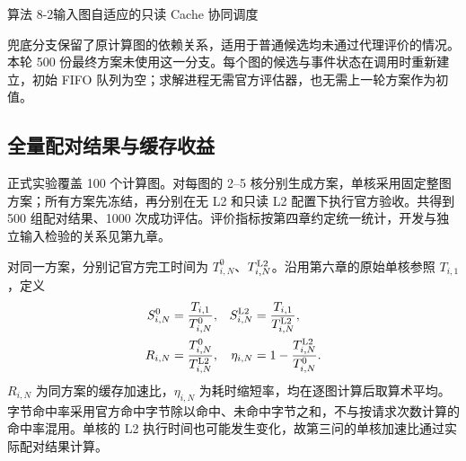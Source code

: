 \begin{algorithmblock}{算法 8-2\quad 输入图自适应的只读 Cache 协同调度}
\end{algorithmblock}

兜底分支保留了原计算图的依赖关系，适用于普通候选均未通过代理评价的情况。本轮 500 份最终方案未使用这一分支。每个图的候选与事件状态在调用时重新建立，初始 FIFO 队列为空；求解进程无需官方评估器，也无需上一轮方案作为初值。

\subsection{全量配对结果与缓存收益}
正式实验覆盖 100 个计算图。对每图的 2--5 核分别生成方案，单核采用固定整图方案；所有方案先冻结，再分别在无 L2 和只读 L2 配置下执行官方验收。共得到 500 组配对结果、1000 次成功评估。评价指标按第四章约定统一统计，开发与独立输入检验的关系见第九章。

对同一方案，分别记官方完工时间为 $T^0_{i,N}$、$T^{\rm L2}_{i,N}$。沿用第六章的原始单核参照 $T_{i,1}$，定义
\begin{equation}
\begin{aligned}
S^0_{i,N}&=\frac{T_{i,1}}{T^0_{i,N}},&
S^{\rm L2}_{i,N}&=\frac{T_{i,1}}{T^{\rm L2}_{i,N}},\\
R_{i,N}&=\frac{T^0_{i,N}}{T^{\rm L2}_{i,N}},&
\eta_{i,N}&=1-\frac{T^{\rm L2}_{i,N}}{T^0_{i,N}}.
\end{aligned}
\label{eq:q3-metrics}
\end{equation}
$R_{i,N}$ 为同方案的缓存加速比，$\eta_{i,N}$ 为耗时缩短率，均在逐图计算后取算术平均。字节命中率采用官方命中字节除以命中、未命中字节之和，不与按请求次数计算的命中率混用。单核的 L2 执行时间也可能发生变化，故第三问的单核加速比通过实际配对结果计算。

